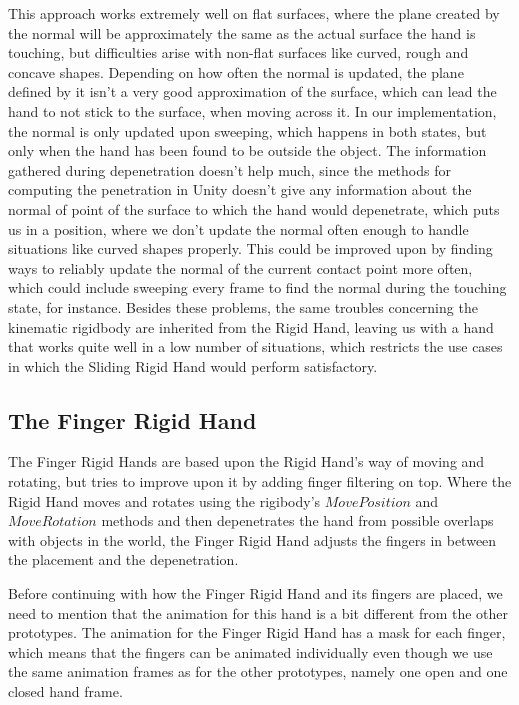 This approach works extremely well on flat surfaces, where the plane created by the normal will be approximately the same as the actual surface the hand is touching, but difficulties arise with non-flat surfaces like curved, rough and concave shapes. Depending on how often the normal is updated, the plane defined by it isn't a very good approximation of the surface, which can lead the hand to not stick to the surface, when moving across it. In our implementation, the normal is only updated upon sweeping, which happens in both states, but only when the hand has been found to be outside the object. The information gathered during depenetration doesn't help much, since the methods for computing the penetration in Unity doesn't give any information about the normal of point of the surface to which the hand would depenetrate, which puts us in a position, where we don't update the normal often enough to handle situations like curved shapes properly. This could be improved upon by finding ways to reliably update the normal of the current contact point more often, which could include sweeping every frame to find the normal during the touching state, for instance. Besides these problems, the same troubles concerning the kinematic rigidbody are inherited from the Rigid Hand, leaving us with a hand that works quite well in a low number of situations, which restricts the use cases in which the Sliding Rigid Hand would perform satisfactory.

\subsection{The Finger Rigid Hand}
\label{subsec:fingerRigidHand}
The Finger Rigid Hands are based upon the Rigid Hand's way of moving and rotating, but tries to improve upon it by adding finger filtering on top. Where the Rigid Hand moves and rotates using the rigibody's $MovePosition$ and $MoveRotation$ methods and then depenetrates the hand from possible overlaps with objects in the world, the Finger Rigid Hand adjusts the fingers in between the placement and the depenetration.

Before continuing with how the Finger Rigid Hand and its fingers are placed, we need to mention that the animation for this hand is a bit different from the other prototypes. The animation for the Finger Rigid Hand has a mask for each finger, which means that the fingers can be animated individually even though we use the same animation frames as for the other prototypes, namely one open and one closed hand frame.

